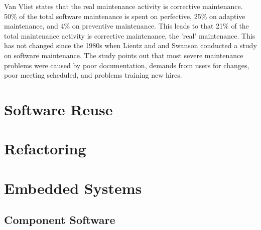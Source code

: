 Van Vliet\cite{Vliet:2008:SEP:1481475} states that the real maintenance activity is corrective maintenance. 50\% of the total software maintenance is spent on perfective, 25\% on adaptive maintenance, and 4\% on preventive maintenance. This leads to that 21\% of the total maintenance activity is corrective maintenance, the 'real' maintenance\cite{Vliet:2008:SEP:1481475}. This has not changed since the 1980s when Lientz and and Swanson conducted a study on software maintenance\cite{lientz1980software}. The study points out that most severe maintenance problems were caused by poor documentation, demands from users for changes, poor meeting scheduled, and problems training new hires.







\section{Software Reuse}





\section{Refactoring}




\section{Embedded Systems}

\subsection{Component Software}

